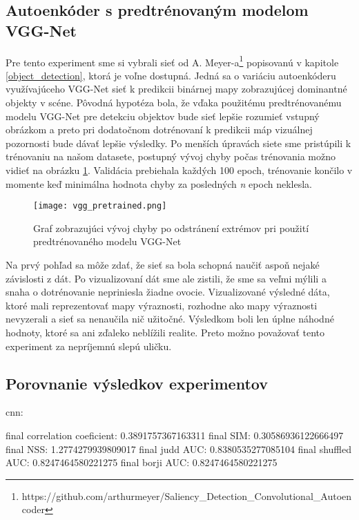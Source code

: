 \subsection{Autoenkóder s predtrénovaným modelom VGG-Net}
\label{experiments_vgg_net}

Pre tento experiment sme si vybrali sieť od A. Meyer-a\footnote{https://github.com/arthurmeyer/Saliency\_Detection\_Convolutional\_Autoencoder} popisovanú v kapitole \ref{object_detection}, ktorá je voľne dostupná. Jedná sa o variáciu autoenkóderu využívajúceho VGG-Net sieť k predikcii binárnej mapy zobrazujúcej dominantné objekty v scéne. Pôvodná hypotéza bola, že vďaka použitému predtrénovanému modelu VGG-Net pre detekciu objektov bude sieť lepšie rozumieť vstupný obrázkom a preto pri dodatočnom dotrénovaní k predikcii máp vizuálnej pozornosti bude dávať lepšie výsledky. Po menších úpravách siete sme pristúpili k trénovaniu na našom datasete, postupný vývoj chyby počas trénovania možno vidieť na obrázku \ref{vgg_pretrained_loss}. Validácia prebiehala každých 100 epoch, trénovanie končilo v momente keď minimálna hodnota chyby za posledných \textit{n} epoch neklesla. 
 
\begin{figure}[H]
	\begin{center}
		\texttt{[image: vgg\_pretrained.png]}
		\caption[Vývoj chyby počas trénovanie siete s predtrénovaným modelom VGG-Net]{
			Graf zobrazujúci vývoj chyby po odstránení extrémov pri použití predtrénovaného modelu VGG-Net 
		}\label{vgg_pretrained_loss}
	\end{center}
\end{figure}

Na prvý pohľad sa môže zdať, že sieť sa bola schopná naučiť aspoň nejaké závislosti z dát. Po vizualizovaní dát sme ale zistili, že sme sa veľmi mýlili a snaha o dotrénovanie nepriniesla žiadne ovocie. Vizualizované výsledné dáta, ktoré mali reprezentovať mapy výraznosti, rozhodne ako mapy výraznosti nevyzerali a sieť sa nenaučila nič užitočné. Výsledkom boli len úplne náhodné hodnoty, ktoré sa ani zďaleko neblížili realite. Preto možno považovať tento experiment za nepríjemnú slepú uličku.

\subsection{Porovnanie výsledkov experimentov}
\label{results}
\iffalse
cnn:

final correlation coeficient: 0.3891757367163311
final SIM: 0.30586936122666497
final NSS: 1.2774279939809017
final judd AUC: 0.8380535277085104
final shuffled AUC: 0.8247464580221275
final borji AUC: 0.8247464580221275


